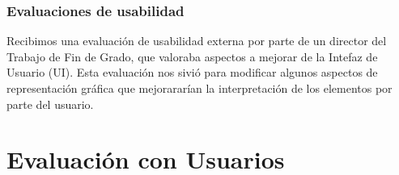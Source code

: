 \subsubsection{Evaluaciones de usabilidad}

Recibimos una evaluación de usabilidad externa por parte de un director del Trabajo de Fin de Grado, que valoraba aspectos a mejorar de la Intefaz de Usuario (UI). Esta evaluación nos sivió para modificar algunos aspectos de representación gráfica que mejorararían la interpretación de los elementos por parte del usuario.

\section{Evaluación con Usuarios}